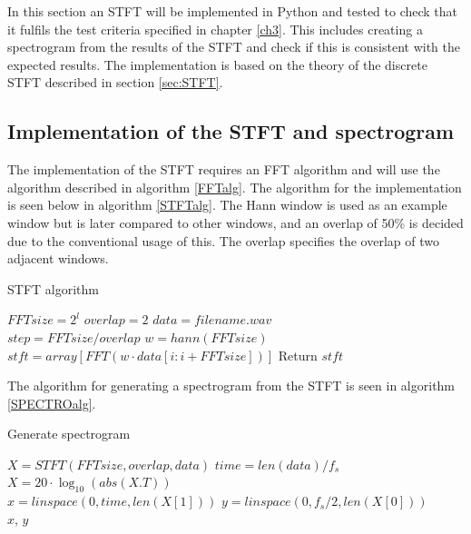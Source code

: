 In this section an STFT will be implemented in Python and tested to check that it fulfils the test criteria specified in chapter \ref{ch3}. This includes creating a spectrogram from the results of the STFT and check if this is consistent with the expected results. The implementation is based on the theory of the discrete STFT described in section \ref{sec:STFT}.

\subsection{Implementation of the STFT and spectrogram}
The implementation of the STFT requires an FFT algorithm and will use the algorithm described in algorithm \ref{FFTalg}. The algorithm for the implementation is seen below in algorithm \ref{STFTalg}. The Hann window is used as an example window but is later compared to other windows, and an overlap of 50\% is decided due to the conventional usage of this. The overlap specifies the overlap of two adjacent windows.
\begin{algorithm}[H]
\caption{STFT algorithm}
\label{STFTalg}
\begin{algorithmic}[1]
\State $FFTsize=2^{l}$ 
\State $overlap=2$ 
\State $data = filename.wav$ \\
\State $step=FFTsize/overlap$
\State $w=hann(FFTsize)$ 
\State $stft = array[FFT(w\cdot data[i:i+FFTsize])]$
\EndFor
\State Return $stft$
\EndProcedure
\end{algorithmic}
\end{algorithm}
The algorithm for generating a spectrogram from the STFT is seen in algorithm \ref{SPECTROalg}.
\begin{algorithm}[H]
\caption{Generate spectrogram}
\label{SPECTROalg}
\begin{algorithmic}[1]
	\State $X=STFT(FFTsize,overlap,data)$ 					
	\State $time=len(data)/f_s$ 
	\State $X=20\cdot \log_{10}(abs(X.T))$ \\
	\State $x=linspace(0,time,len(X[1]))$ 		
	\State $y=linspace(0,f_s/2,len(X[0]))$ 	\\
	\Return $x$, $y$
\EndProcedure
\end{algorithmic}
\end{algorithm}

